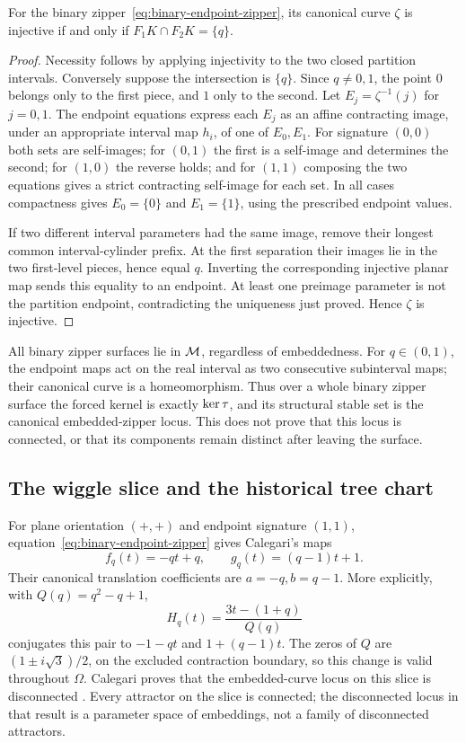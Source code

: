 \begin{proposition}\label{prop:binary-embedding}
For the binary zipper~\eqref{eq:binary-endpoint-zipper}, its canonical
curve $\zeta$ is injective if and only if
$F_1K\cap F_2K=\{q\}$.
\end{proposition}
\begin{proof}
Necessity follows by applying injectivity to the two closed
partition intervals. Conversely suppose the intersection is
$\{q\}$. Since $q\ne0,1$, the point $0$ belongs only to the first
piece, and $1$ only to the second. Let $E_j=\zeta^{-1}(j)$ for $j=0,1$.
The endpoint equations express each $E_j$ as an affine contracting
image, under an appropriate interval map $h_i$, of one of $E_0,E_1$.
For signature $(0,0)$ both sets are self-images; for $(0,1)$ the
first is a self-image and determines the second; for $(1,0)$ the
reverse holds; and for $(1,1)$ composing the two equations gives
a strict contracting self-image for each set. In all cases
compactness gives $E_0=\{0\}$ and $E_1=\{1\}$, using the prescribed
endpoint values.

If two different interval parameters had the same image, remove
their longest common interval-cylinder prefix. At the first
separation their images lie in the two first-level pieces, hence
equal $q$. Inverting the corresponding injective planar map sends
this equality to an endpoint. At least one preimage parameter is
not the partition endpoint, contradicting the uniqueness just
proved. Hence $\zeta$ is injective.
\end{proof}

All binary zipper surfaces lie in $\mathcal M$, regardless of embeddedness.
For $q\in(0,1)$, the endpoint maps act on the real interval as two
consecutive subinterval maps; their canonical curve is a
homeomorphism. Thus over a whole binary zipper surface the forced
kernel is exactly $\operatorname{ker}\tau$, and its structural stable set is
the canonical embedded-zipper locus. This does not prove that this
locus is connected, or that its components remain distinct after
leaving the surface.

\subsection{The wiggle slice and the historical tree chart}

For plane orientation $(+,+)$ and endpoint signature $(1,1)$,
equation~\eqref{eq:binary-endpoint-zipper} gives Calegari's maps
\[
f_q(t)=-qt+q,\qquad g_q(t)=(q-1)t+1.
\]
Their canonical translation coefficients are $a=-q,b=q-1$.
More explicitly, with $Q(q)=q^2-q+1$,
\[
H_q(t)=\frac{3t-(1+q)}{Q(q)}
\]
conjugates this pair to $-1-qt$ and $1+(q-1)t$.
The zeros of $Q$ are $(1\pm i\sqrt3)/2$, on the excluded
contraction boundary, so this change is valid throughout $\Omega$.
Calegari proves that the embedded-curve locus on this slice is
disconnected \cite{Calegari2026}. Every attractor on the slice is
connected; the disconnected locus in that result is a parameter
space of embeddings, not a family of disconnected attractors.

